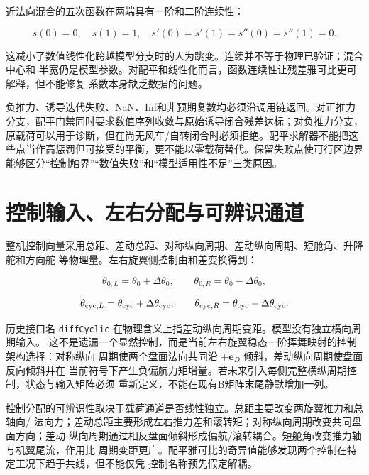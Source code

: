\documentclass[UTF8,12pt,oneside,openany,fontset=windows]{ctexbook}
\begin{document}
近法向混合的五次函数在两端具有一阶和二阶连续性：

\begin{equation}
s(0)=0,\quad s(1)=1,\quad s'(0)=s'(1)=s''(0)=s''(1)=0.
\end{equation}

这减小了数值线性化跨越模型分支时的人为跳变。连续并不等于物理已验证；混合中心和 半宽仍是模型参数。对配平和线性化而言，函数连续性让残差雅可比更可解释，但不能修复 系数本身缺乏数据的问题。

负推力、诱导迭代失败、NaN、Inf和非预期复数均必须沿调用链返回。对正推力分支，配平门禁同时要求数值序列收敛与原始诱导闭合残差达标；对负推力分支，原载荷可以用于诊断，但在尚无风车/自转闭合时必须拒绝。配平求解器不能把这些点当作高惩罚但可接受的平衡，更不能以零载荷替代。保留失败点使可行区边界能够区分“控制触界”“数值失败”和“模型适用性不足”三类原因。

\section{控制输入、左右分配与可辨识通道}

整机控制向量采用总距、差动总距、对称纵向周期、差动纵向周期、短舱角、升降舵和方向舵 等物理量。左右旋翼侧控制由和差变换得到：

\begin{equation}
\theta_{0,L}=\theta_0+\Delta\theta_0,\qquad
\theta_{0,R}=\theta_0-\Delta\theta_0,
\end{equation}

\begin{equation}
\theta_{{\rm cyc},L}=\theta_{\rm cyc}+\Delta\theta_{\rm cyc},\qquad
\theta_{{\rm cyc},R}=\theta_{\rm cyc}-\Delta\theta_{\rm cyc}.
\end{equation}

历史接口名 \texttt{diffCyclic} 在物理含义上指差动纵向周期变距。模型没有独立横向周期输入。 这不是遗漏一个显然控制，而是当前左右旋翼稳态一阶挥舞映射的控制架构选择：对称纵向 周期使两个盘面法向共同沿 \(+\mathbf e_D\) 倾斜，差动纵向周期使盘面反向倾斜并在 当前符号下产生负偏航力矩增量。若未来引入每侧完整横纵周期控制，状态与输入矩阵必须 重新定义，不能在现有B矩阵末尾静默增加一列。

控制分配的可辨识性取决于载荷通道是否线性独立。总距主要改变两旋翼推力和总轴向/ 法向力；差动总距主要形成左右推力差和滚转矩；对称纵向周期改变共同盘面方向；差动 纵向周期通过相反盘面倾斜形成偏航/滚转耦合。短舱角改变推力轴与机翼尾流，作用比 周期变距更广。配平雅可比的奇异值能够发现两个控制在特定工况下趋于共线，但不能仅凭 控制名称预先假定解耦。
\end{document}
